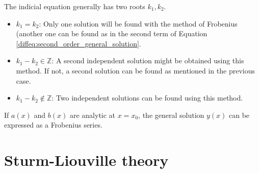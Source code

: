     \begin{property}
        The indicial equation generally has two roots $k_1,k_2$.
        \begin{itemize}
            \item $k_1=k_2$: Only one solution will be found with the method of Frobenius (another one can be found as in the second term of Equation \eqref{diffeq:second_order_general_solution}.
            \item $k_1-k_2 \in\mathbb{Z}$: A second independent solution might be obtained using this method. If not, a second solution can be found as mentioned in the previous case.
            \item $k_1-k_2\not\in\mathbb{Z}$: Two independent solutions can be found using this method.
        \end{itemize}
    \end{property}

    \begin{theorem}[Fuchs]
        If $a(x)$ and $b(x)$ are analytic at $x=x_0$, the general solution $y(x)$ can be expressed as a Frobenius series.
    \end{theorem}

\section{Sturm-Liouville theory}


